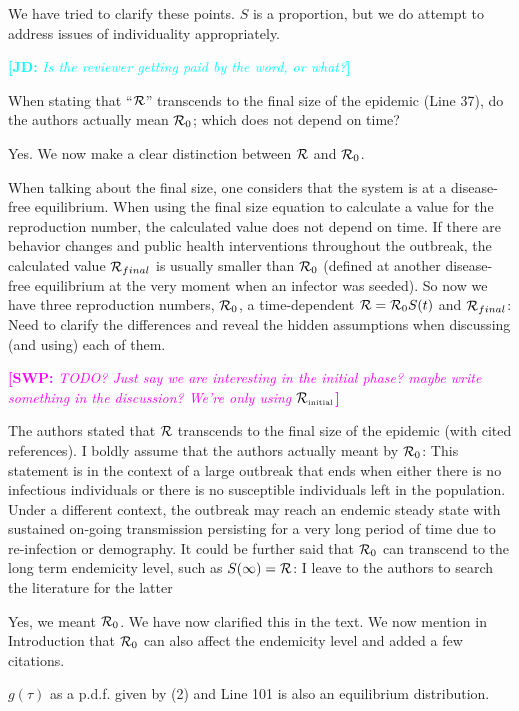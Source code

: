 \documentclass[12pt]{article}
\newcommand{\RR}{\ensuremath{{\cal R}}}
\newcommand{\Rx}[1]{\ensuremath{{\cal R}_{#1}}}
\newcommand{\Ro}{\Rx{0}}
\newcommand{\Rini}{\Rx{\textrm{\tiny initial}}}
\newcommand{\revtext}{\textsf}
\newcommand{\comment}[3]{\textcolor{#1}{\textbf{[#2: }\textsl{#3}\textbf{]}}}
\newcommand{\jd}[1]{\comment{cyan}{JD}{#1}}
\newcommand{\swp}[1]{\comment{magenta}{SWP}{#1}}
\begin{document}
We have tried to clarify these points. $S$ is a proportion, but we do attempt to address issues of individuality appropriately.

\jd{Is the reviewer getting paid by the word, or what?}

\revtext{
When stating that ``$\RR$'' transcends to the final size of the epidemic (Line
37), do the authors actually mean $\Ro$; which does not depend on time?
}

Yes. We now make a clear distinction between $\RR$ and $\Ro$.

\revtext{
When talking about the final size, one considers that the system is at a
disease-free equilibrium. When using the final size equation to calculate a
value for the reproduction number, the calculated value does not depend
on time. If there are behavior changes and public health interventions
throughout the outbreak, the calculated value $\RR_{final}$ is usually smaller
than $\Ro$ (defined at another disease-free equilibrium at the very moment
when an infector was seeded). So now we have three reproduction numbers, $\Ro$, a time-dependent $\RR = \Ro S(t)$ and $\RR_{final}$: Need to clarify the differences and reveal the hidden assumptions when discussing (and using)
each of them.
}

\swp{TODO? Just say we are interesting in the initial phase? maybe write something in the discussion? We're only using $\Rini$}

\revtext{
The authors stated that $\RR$ transcends to the final size of the epidemic
(with cited references). I boldly assume that the authors actually meant
by $\Ro$: This statement is in the context of a large outbreak that ends
when either there is no infectious individuals or there is no susceptible
individuals left in the population. Under a different context, the outbreak
may reach an endemic steady state with sustained on-going transmission
persisting for a very long period of time due to re-infection or demography.
It could be further said that $\Ro$ can transcend to the long term endemicity
level, such as $S(\infty) = \RR$: I leave to the authors to search the literature
for the latter
}

Yes, we meant $\Ro$. We have now clarified this in the text.
We now mention in Introduction that $\Ro$ can also affect the endemicity level and added a few citations.

\revtext{$g(\tau)$ as a p.d.f. given by (2) and Line 101 is also an equilibrium
distribution.}
\end{document}
